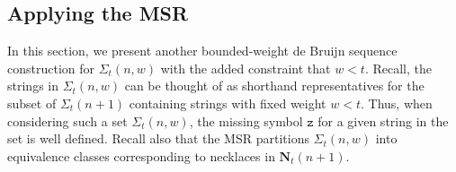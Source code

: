 \documentclass[US-letter,USenglish,authorcolumns,autoref]{lipics-v2021}
\renewcommand{\tt} {\mathtt}
\newcommand{\bN}{\mathbf{N}}
\begin{document}

\subsection{Applying the MSR} \label{sec:msr}

In this section, we present another bounded-weight de Bruijn sequence construction for $\Sigma_t(n,w)$ with the added constraint that $w < t$. Recall, the strings in $\Sigma_t(n,w)$ can be thought of as shorthand representatives for the subset of $\Sigma_t(n+1)$ containing strings with fixed weight $w<t$. Thus, when considering such a set $\Sigma_t(n,w)$, the  missing symbol $\tt{z}$ for a given string in the set is well defined.
%
Recall also that the MSR partitions $\Sigma_t(n,w)$ into equivalence classes corresponding to necklaces in $\bN_t(n+1)$.
\end{document}
